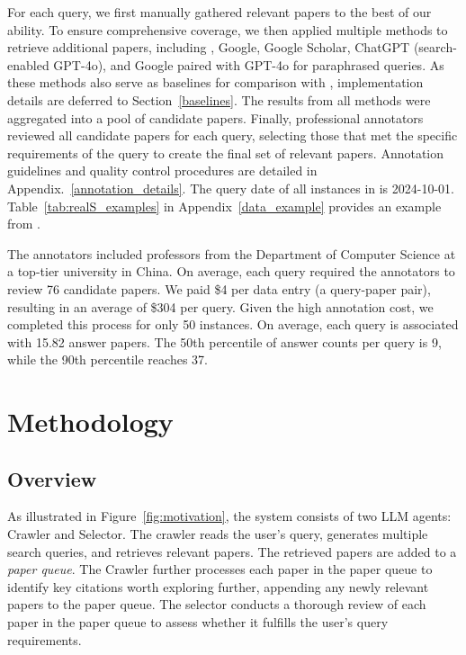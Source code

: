 For each query, we first manually gathered relevant papers to the best of our ability. To ensure comprehensive coverage, we then applied multiple methods to retrieve additional papers, including \pasa, Google, Google Scholar, ChatGPT (search-enabled GPT-4o), and Google paired with GPT-4o for paraphrased queries. As these methods also serve as baselines for comparison with \pasa, implementation details are deferred to Section~\ref{baselines}. The results from all methods were aggregated into a pool of candidate papers. Finally, professional annotators reviewed all candidate papers for each query, selecting those that met the specific requirements of the query to create the final set of relevant papers. Annotation guidelines and quality control procedures are detailed in Appendix.~\ref{annotation_details}. The query date of all instances in \realS is 2024-10-01. Table~\ref{tab:realS_examples} in Appendix~\ref{data_example} provides an example from \realS.

The annotators included professors from the Department of Computer Science at a top-tier university in China. On average, each query required the annotators to review 76 candidate papers. We paid \$4 per data entry (a query-paper pair), resulting in an average of \$304 per query. Given the high annotation cost, we completed this process for only 50 instances. On average, each query is associated with 15.82 answer papers. The 50th percentile of answer counts per query is 9, while the 90th percentile reaches 37.

\section{Methodology}

\subsection{Overview}

As illustrated in Figure~\ref{fig:motivation}, the \pasa system consists of two LLM agents: Crawler and Selector. The crawler reads the user's query, generates multiple search queries, and retrieves relevant papers. The retrieved papers are added to a \emph{paper queue}. The Crawler further processes each paper in the paper queue to identify key citations worth exploring further, appending any newly relevant papers to the paper queue. The selector conducts a thorough review of each paper in the paper queue to assess whether it fulfills the user's query requirements.

